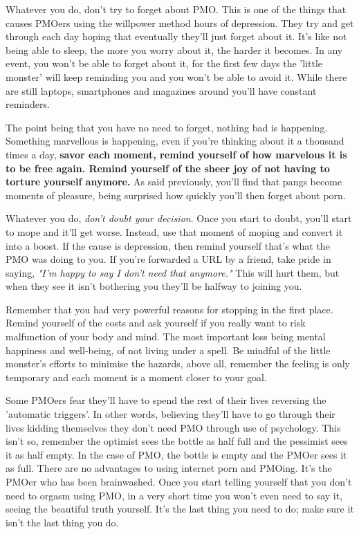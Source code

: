 \documentclass[easypeasy.tex]{subfiles}
\begin{document}
Whatever you do, don't try to forget about PMO. This is one of the things that causes PMOers using the willpower method hours of depression. They try and get through each day hoping that eventually they'll just forget about it. It's like not being able to sleep, the more you worry about it, the harder it becomes. In any event, you won't be able to forget about it, for the first few days the 'little monster' will keep reminding you and you won't be able to avoid it. While there are still laptops, smartphones and magazines around you'll have constant reminders.

The point being that you have no need to forget, nothing bad is happening. Something marvellous is happening, even if you're thinking about it a thousand times a day, \textbf{savor each moment, remind yourself of how marvelous it is to be free again. Remind yourself of the sheer joy of not having to torture yourself anymore.} As said previously, you'll find that pangs become moments of pleasure, being surprised how quickly you'll then forget about porn.

Whatever you do, \textit{don't doubt your decision}. Once you start to doubt, you'll start to mope and it'll get worse. Instead, use that moment of moping and convert it into a boost. If the cause is depression, then remind yourself that's what the PMO was doing to you. If you're forwarded a URL by a friend, take pride in saying, \textit{"I'm happy to say I don't need that anymore."} This will hurt them, but when they see it isn't bothering you they'll be halfway to joining you.

Remember that you had very powerful reasons for stopping in the first place. Remind yourself of the costs and ask yourself if you really want to risk malfunction of your body and mind. The most important loss being mental happiness and well-being, of not living under a spell. Be mindful of the little monster's efforts to minimise the hazards, above all, remember the feeling is only temporary and each moment is a moment closer to your goal.

Some PMOers fear they'll have to spend the rest of their lives reversing the 'automatic triggers'. In other words, believing they'll have to go through their lives kidding themselves they don't need PMO through use of psychology. This isn't so, remember the optimist sees the bottle as half full and the pessimist sees it as half empty. In the case of PMO, the bottle is empty and the PMOer sees it as full. There are no advantages to using internet porn and PMOing. It's the PMOer who has been brainwashed. Once you start telling yourself that you don't need to orgasm using PMO, in a very short time you won't even need to say it, seeing the beautiful truth yourself. It's the last thing you need to do; make sure it isn't the last thing you do.
\end{document}
